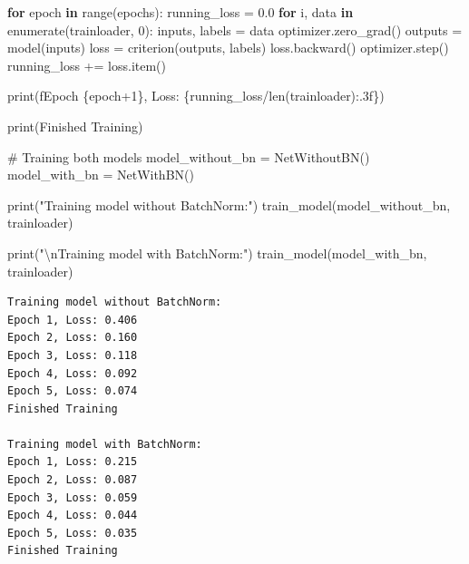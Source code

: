 \documentclass[
  letterpaper,
  DIV=11,
  numbers=noendperiod]{scrreprt}
\newenvironment{Shaded}{\begin{snugshade}}{\end{snugshade}}
\newcommand{\BuiltInTok}[1]{\textcolor[rgb]{0.00,0.23,0.31}{#1}}
\newcommand{\CharTok}[1]{\textcolor[rgb]{0.13,0.47,0.30}{#1}}
\newcommand{\CommentTok}[1]{\textcolor[rgb]{0.37,0.37,0.37}{#1}}
\newcommand{\ControlFlowTok}[1]{\textcolor[rgb]{0.00,0.23,0.31}{\textbf{#1}}}
\newcommand{\DecValTok}[1]{\textcolor[rgb]{0.68,0.00,0.00}{#1}}
\newcommand{\FloatTok}[1]{\textcolor[rgb]{0.68,0.00,0.00}{#1}}
\newcommand{\KeywordTok}[1]{\textcolor[rgb]{0.00,0.23,0.31}{\textbf{#1}}}
\newcommand{\NormalTok}[1]{\textcolor[rgb]{0.00,0.23,0.31}{#1}}
\newcommand{\OperatorTok}[1]{\textcolor[rgb]{0.37,0.37,0.37}{#1}}
\newcommand{\SpecialCharTok}[1]{\textcolor[rgb]{0.37,0.37,0.37}{#1}}
\newcommand{\SpecialStringTok}[1]{\textcolor[rgb]{0.13,0.47,0.30}{#1}}
\newcommand{\StringTok}[1]{\textcolor[rgb]{0.13,0.47,0.30}{#1}}
\begin{document}
\begin{Shaded}
\begin{Highlighting}[]
    \ControlFlowTok{for}\NormalTok{ epoch }\KeywordTok{in} \BuiltInTok{range}\NormalTok{(epochs):}
\NormalTok{        running\_loss }\OperatorTok{=} \FloatTok{0.0}
        \ControlFlowTok{for}\NormalTok{ i, data }\KeywordTok{in} \BuiltInTok{enumerate}\NormalTok{(trainloader, }\DecValTok{0}\NormalTok{):}
\NormalTok{            inputs, labels }\OperatorTok{=}\NormalTok{ data}
\NormalTok{            optimizer.zero\_grad()}
\NormalTok{            outputs }\OperatorTok{=}\NormalTok{ model(inputs)}
\NormalTok{            loss }\OperatorTok{=}\NormalTok{ criterion(outputs, labels)}
\NormalTok{            loss.backward()}
\NormalTok{            optimizer.step()}
\NormalTok{            running\_loss }\OperatorTok{+=}\NormalTok{ loss.item()}
            
        \BuiltInTok{print}\NormalTok{(}\SpecialStringTok{f\textquotesingle{}Epoch }\SpecialCharTok{\{}\NormalTok{epoch}\OperatorTok{+}\DecValTok{1}\SpecialCharTok{\}}\SpecialStringTok{, Loss: }\SpecialCharTok{\{}\NormalTok{running\_loss}\OperatorTok{/}\BuiltInTok{len}\NormalTok{(trainloader)}\SpecialCharTok{:.3f\}}\SpecialStringTok{\textquotesingle{}}\NormalTok{)}
    
    \BuiltInTok{print}\NormalTok{(}\StringTok{\textquotesingle{}Finished Training\textquotesingle{}}\NormalTok{)}

\CommentTok{\# Training both models}
\NormalTok{model\_without\_bn }\OperatorTok{=}\NormalTok{ NetWithoutBN()}
\NormalTok{model\_with\_bn }\OperatorTok{=}\NormalTok{ NetWithBN()}

\BuiltInTok{print}\NormalTok{(}\StringTok{"Training model without BatchNorm:"}\NormalTok{)}
\NormalTok{train\_model(model\_without\_bn, trainloader)}

\BuiltInTok{print}\NormalTok{(}\StringTok{"}\CharTok{\textbackslash{}n}\StringTok{Training model with BatchNorm:"}\NormalTok{)}
\NormalTok{train\_model(model\_with\_bn, trainloader)}
\end{Highlighting}
\end{Shaded}

\begin{verbatim}
Training model without BatchNorm:
Epoch 1, Loss: 0.406
Epoch 2, Loss: 0.160
Epoch 3, Loss: 0.118
Epoch 4, Loss: 0.092
Epoch 5, Loss: 0.074
Finished Training

Training model with BatchNorm:
Epoch 1, Loss: 0.215
Epoch 2, Loss: 0.087
Epoch 3, Loss: 0.059
Epoch 4, Loss: 0.044
Epoch 5, Loss: 0.035
Finished Training
\end{verbatim}
\end{document}
